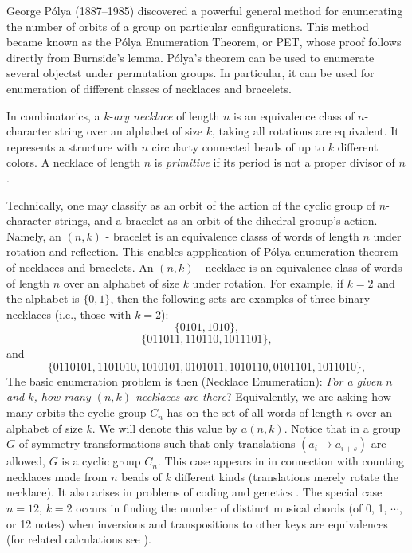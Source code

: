 \documentclass[12pt]{amsart}
\begin{document}
{George P\'olya (1887--1985) discovered a powerful general method for 
enumerating the number of orbits of a group on particular configurations. 
This method became known as the P\'olya Enumeration Theorem, or PET, whose
proof follows directly from Burnside's lemma.  
     P\'olya's theorem can be used to enumerate several objectst under 
permutation groups. In particular, it can be used for enumeration of 
different classes of necklaces and bracelets.

In combinatorics, a $k$-{\it ary necklace} of length $n$ is an equivalence 
class 
of $n$-character string  over an alphabet of size $k$, taking all rotations 
are equivalent. It represents a structure with $n$ circularty connected 
beads of up to $k$ different colors. A necklace of length $n$ is 
{\it primitive} if its period is not a proper divisor of $n$. 
  
Technically, one may classify as an orbit of the action of the cyclic group 
of $n$-character strings, and a bracelet as an orbit of the dihedral grooup's
action. Namely, an $(n,k)$ - bracelet is an equivalence classs of words of 
length $n$ under rotation and reflection.  
This enables appplication of P\'olya enumeration theorem of necklaces 
and bracelets. An $(n,k)$ - necklace is an equivalence class of words of length 
$n$ over an alphabet of size $k$ under rotation. For example, if $k=2$  
and the alphabet is $\{0,1\}$, then the following sets are  examples of three 
 binary necklaces (i.e., those with $k=2$):
  $$
\{0101,1010\},
  $$ 
  $$
\{011011,110110,1011101\},
$$
and
 $$
\{0110101,1101010,1010101,0101011,1010110,0101101,1011010\},
    $$  
The basic enumeration problem is 
then (Necklace Enumeration): {\it For a given $n$ and $k$, how many 
$(n,k)$-necklaces are there}? Equivalently,  we are asking how many orbits 
 the  cyclic group $C_n$ has on the set of all words of  length $n$ over an 
alphabet of size $k$. We will denote this value by $a(n,k)$. Notice that in 
a group $G$ of symmetry transformations such that only translations 
$(a_i\to a_{i+s})$ are allowed, $G$ is a cyclic group $C_n$. This case appears 
in \cite{ri} in connection with counting necklaces made from $n$ beads 
of $k$  different kinds (translations merely rotate the necklace). It also 
arises in problems of coding and genetics \cite{ggw}. The special
case $n=12$, $k=2$ occurs in finding the number of distinct musical
chords (of 0, 1, $\cdots$, or  12 notes) when inversions and transpositions 
to other keys are equivalences (for related calculations see 
\cite[Section 6]{gir}).           
 
}
\end{document}
